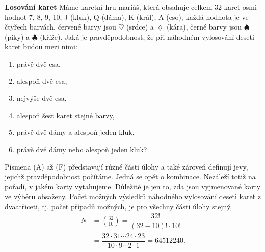 \begin{mdframed}[style=mdexam]
  \begin{example}\label{mai:exam053}
    \textbf{Losování karet}\newline
      Máme karetní hru mariáš, která obsahuje celkem \num{32} karet osmi hodnot \num{7}, \num{8},
      \num{9}, \num{10}, J (kluk), Q (dáma), K (král), A (eso), každá hodnota je ve čtyřech barvách,
      červené barvy jsou \(\heartsuit\) (srdce) a \(\lozenge\) (kára), černé barvy jsou
      \(\spadesuit\) (piky) a \(\clubsuit\) (kříže). Jaká je pravděpodobnost, že při náhodném
      vylosování deseti karet budou mezi nimi:
      \begin{enumerate}[leftmargin=1cm,rightmargin=1cm, label=\emph{\Alph*}),noitemsep]
        \item právě dvě esa,
        \item alespoň dvě esa,
        \item nejvýše dvě esa,
        \item alespoň šest karet stejné barvy,
        \item právě dvě dámy a alespoň jeden kluk,
        \item právě dvě dámy nebo alespoň jeden kluk?
      \end{enumerate}

      Písmena (A) až (F) představují různé části úlohy a také zároveň definují jevy, jejichž
      pravděpodobnost počítáme. Jedná se opět o kombinace. Nezáleží totiž na pořadí, v jakém karty
      vytahujeme. Důležité je jen to, zda jsou vyjmenované karty ve výběru obsaženy. Počet možných
      výsledků náhodného vylosování deseti karet z dvaatřiceti, tj. počet případů možných, je pro
      všechny části úlohy stejný,
      \begin{align*}
        N&=\binom{32}{10} = \dfrac{32!}{(32-10)!\cdot10!}                                   \\
		 &= \dfrac{32\cdot31\cdots24\cdot23}{10\cdot9\cdots2\cdot1} = \num{64512240}.
      \end{align*}
      

\end{example}
\end{mdframed}
